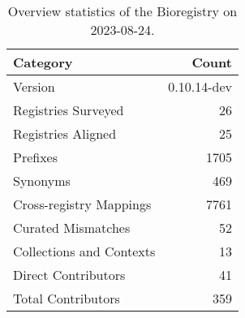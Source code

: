 \begin{table}
\caption{Overview statistics of the Bioregistry on 2023-08-24.}
\label{tab:bioregistry-summary}
\begin{tabular}{lr}
\toprule
Category & Count \\
\midrule
Version & 0.10.14-dev \\
Registries Surveyed & 26 \\
Registries Aligned & 25 \\
Prefixes & 1705 \\
Synonyms & 469 \\
Cross-registry Mappings & 7761 \\
Curated Mismatches & 52 \\
Collections and Contexts & 13 \\
Direct Contributors & 41 \\
Total Contributors & 359 \\
\bottomrule
\end{tabular}
\end{table}
